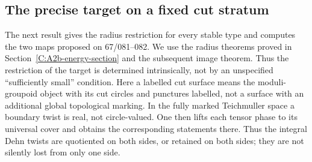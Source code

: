 \subsection{The precise target on a fixed cut stratum}

The next result gives the radius restriction for every stable type and
computes the two maps proposed on 67/081--082. We use the radius theorems
proved in Section~\ref{C:A2b-energy-section} and the subsequent image
theorem. Thus the restriction of the target is determined intrinsically,
not by an unspecified ``sufficiently small'' condition. Here a labelled
cut surface means the moduli-groupoid object with its cut circles and
punctures labelled, not a surface with an additional global topological
marking. In the fully marked Teichmuller space a boundary twist is real,
not circle-valued. One then lifts each tensor phase to its universal
cover and obtains the corresponding statements there. Thus the
integral Dehn twists are quotiented on both sides, or retained on both
sides; they are not silently lost from only one side.

